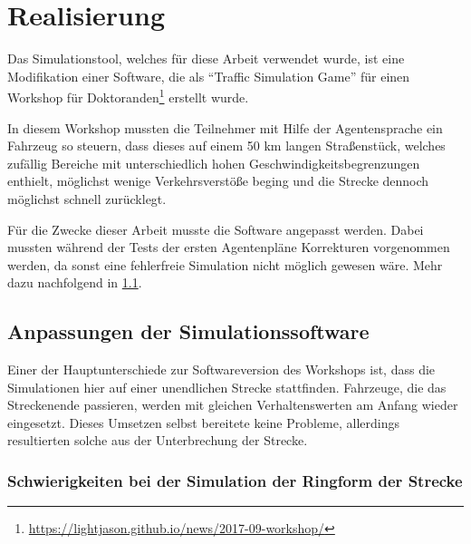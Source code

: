 \section{Realisierung}
\label{sec:realisierung}

Das Simulationstool, welches für diese Arbeit verwendet wurde, ist eine Modifikation einer Software, die als \enquote{Traffic Simulation Game} für einen Workshop für Doktoranden\footnote{\url{https://lightjason.github.io/news/2017-09-workshop/}} erstellt wurde.

In diesem Workshop mussten die Teilnehmer mit Hilfe der Agentensprache ein Fahrzeug so steuern, dass dieses auf einem 50 km langen Straßenstück, welches zufällig Bereiche mit unterschiedlich hohen Geschwindigkeitsbegrenzungen enthielt, möglichst wenige Verkehrsverstöße beging und die Strecke dennoch möglichst schnell zurücklegt.

Für die Zwecke dieser Arbeit musste die Software angepasst werden.
Dabei mussten während der Tests der ersten Agentenpläne Korrekturen vorgenommen werden, da sonst eine fehlerfreie Simulation nicht möglich gewesen wäre. 
Mehr dazu nachfolgend in \cref{sec:anpassungen-probleme}.




\subsection{Anpassungen der Simulationssoftware}
\label{sec:anpassungen-probleme}

Einer der Hauptunterschiede zur Softwareversion des Workshops ist, dass die Simulationen hier auf einer unendlichen Strecke stattfinden.
Fahrzeuge, die das Streckenende passieren, werden mit gleichen Verhaltenswerten am Anfang wieder eingesetzt.
Dieses Umsetzen selbst bereitete keine Probleme, allerdings resultierten solche aus der Unterbrechung der Strecke.



\subsubsection{Schwierigkeiten bei der Simulation der Ringform der Strecke}
\label{sec:probleme-ringform}

